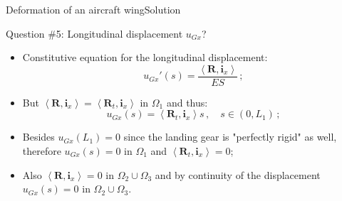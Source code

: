 \documentclass{beamer}
\newcommand{\uj}{u}
\newcommand{\xj}{x}
\renewcommand{\ij}{i}
\newcommand{\iv}{{\boldsymbol\ij}}
\newcommand{\medium}{\Omega}
\newcommand{\Fresj}{R}
\newcommand{\Fres}{{\boldsymbol\Fresj}}
\newcommand{\scal}[1]{\left\langle{#1}\right\rangle}
\begin{document}
\begin{frame}{Deformation of an aircraft wing}{Solution}
\begin{overprint}
\vskip-20pt
\begin{exampleblock}{Question \#5: Longitudinal displacement $\uj_{G\xj}$?}
\begin{itemize}
\item Constitutive equation for the longitudinal displacement:
\begin{displaymath}
\uj_{G\xj}'(s) =\frac{\scal{\Fres,\iv_\xj}}{ES}\,;
\end{displaymath}
\item But $\scal{\Fres,\iv_\xj}=\scal{\Fres_t,\iv_\xj}$ in $\medium_1$  and thus:
\begin{displaymath}
\uj_{G\xj}(s) =\scal{\Fres_t,\iv_\xj}s \,,\quad s\in(0,L_1)\,;
\end{displaymath}
\item Besides $\uj_{G\xj}(L_1)=0$ since the landing gear is "perfectly rigid" as well, therefore $\uj_{G\xj}(s)=0$ in $\medium_1$ and $\scal{\Fres_t,\iv_\xj}=0$;
\item Also $\scal{\Fres,\iv_\xj}=0$ in $\medium_2\cup\medium_3$ and by continuity of the displacement $\uj_{G\xj}(s)=0$ in $\medium_2\cup\medium_3$.
\end{itemize}
\end{exampleblock}

\end{overprint}

\end{frame}
\end{document}
